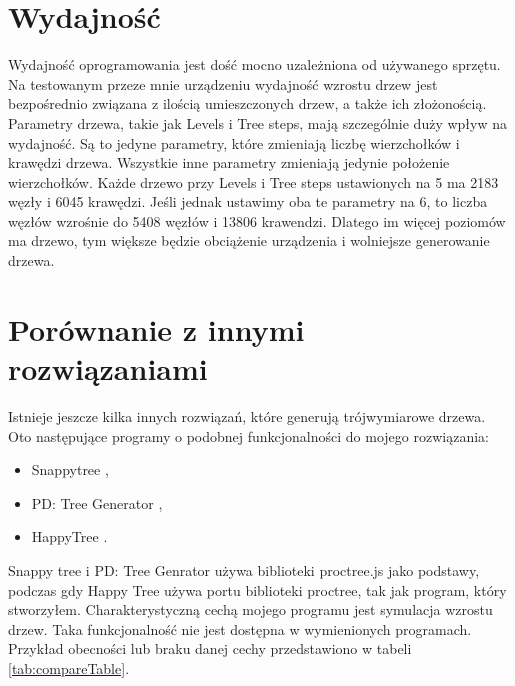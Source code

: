 \documentclass[a4paper,12pt,twoside]{book} %
\begin{document}
\section{Wydajność}

Wydajność oprogramowania jest dość mocno uzależniona 
od używanego sprzętu. Na testowanym przeze mnie 
urządzeniu wydajność wzrostu drzew jest bezpośrednio 
związana z ilością umieszczonych drzew, a także ich 
złożonością. Parametry drzewa, takie jak Levels i Tree steps, 
mają szczególnie duży wpływ na wydajność.
Są to jedyne parametry, które zmieniają liczbę wierzchołków i 
krawędzi drzewa. Wszystkie inne parametry zmieniają jedynie 
położenie wierzchołków. Każde drzewo przy Levels i Tree steps 
ustawionych na 5 ma 2183 węzły i 6045 krawędzi. 
Jeśli jednak ustawimy oba te parametry na 6, 
to liczba węzłów wzrośnie do 5408 węzłów i 13806 krawendzi. 
Dlatego im więcej poziomów ma drzewo, tym większe będzie obciążenie urządzenia 
i wolniejsze generowanie drzewa.

\section{Porównanie z innymi rozwiązaniami}

Istnieje jeszcze kilka innych rozwiązań, które generują 
trójwymiarowe drzewa. Oto następujące programy o podobnej 
funkcjonalności do mojego rozwiązania:
\begin{itemize}
	\item Snappytree \cite{snappyTree},
	\item PD: Tree Generator \cite{PDTree},
	\item HappyTree \cite{proctree}. 
\end{itemize}
Snappy tree i PD: Tree Genrator używa biblioteki proctree.js 
jako podstawy, podczas gdy Happy Tree używa portu biblioteki proctree, 
tak jak program, który stworzyłem.
Charakterystyczną cechą mojego programu jest symulacja wzrostu drzew. 
Taka funkcjonalność nie jest dostępna w wymienionych programach.
Przykład obecności lub braku danej cechy przedstawiono w tabeli \ref{tab:compareTable}.
\end{document}
